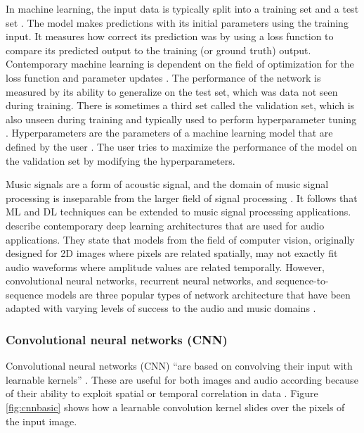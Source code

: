 \documentclass[report.tex]{subfiles}
\begin{document}
In machine learning, the input data is typically split into a training set and a test set \parencite{introtoml}. The model makes predictions with its initial parameters using the training input. It measures how correct its prediction was by using a loss function to compare its predicted output to the training (or ground truth) output. Contemporary machine learning is dependent on the field of optimization \parencite{boyd2004convex, mlopt1, mlopt2} for the loss function and parameter updates \parencite{sgd}. The performance of the network is measured by its ability to generalize on the test set, which was data not seen during training. There is sometimes a third set called the validation set, which is also unseen during training and typically used to perform hyperparameter tuning \parencite{splitvaliddata}. Hyperparameters are the parameters of a machine learning model that are defined by the user \parencite{introtodl}. The user tries to maximize the performance of the model on the validation set by modifying the hyperparameters.

Music signals are a form of acoustic signal, and the domain of music signal processing is inseparable from the larger field of signal processing \parencite{musicsp}. It follows that ML and DL techniques can be extended to music signal processing applications. \textcite{audiodeeplearning} describe contemporary deep learning architectures that are used for audio applications. They state that models from the field of computer vision, originally designed for 2D images where pixels are related spatially, may not exactly fit audio waveforms where amplitude values are related temporally. However, convolutional neural networks, recurrent neural networks, and sequence-to-sequence models are three popular types of network architecture that have been adapted with varying levels of success to the audio and music domains \parencite{audiodeeplearning}.

\subsubsection{Convolutional neural networks (CNN)}
\label{sec:cnn}

Convolutional neural networks (CNN) ``are based on convolving their input with learnable kernels'' \parencite[3]{audiodeeplearning}. These are useful for both images and audio according because of their ability to exploit spatial or temporal correlation in data \parencite{cnns}. Figure \ref{fig:cnnbasic} shows how a learnable convolution kernel slides over the pixels of the input image.
\end{document}
